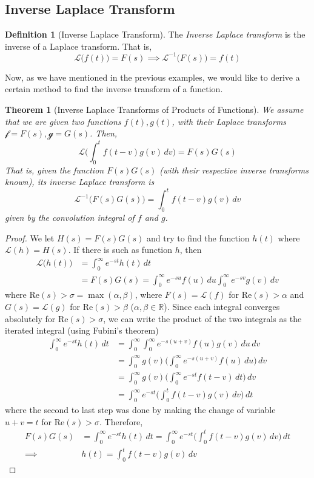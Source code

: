 \documentclass{article}
\newtheorem{theorem}{Theorem}[section]
\theoremstyle{remark}
\theoremstyle{definition}
\newtheorem{definition}{Definition}[section]
\begin{document}
\subsection{Inverse Laplace Transform}

\begin{definition}[Inverse Laplace Transform]
The \textit{Inverse Laplace transform} is the inverse of a Laplace transform. That is, 
\[\mathcal{L}\big( f(t)\big) = F(s) \implies  \mathcal{L}^{-1} \big(F(s)\big) = f(t)\]
\end{definition}

Now, as we have mentioned in the previous examples, we would like to derive a certain method to find the inverse transform of a function. 

\begin{theorem}[Inverse Laplace Transforms of Products of Functions]
We assume that we are given two functions $f(t), g(t)$, with their Laplace transforms $\mathcal{f} = F(s), \mathcal{g} = G(s)$. Then, 
\[\mathcal{L}\bigg(\int_0^t f(t-v) g(v)\,dv \bigg) = F(s)G(s)\]
That is, given the function $F(s) G(s)$ (with their respective inverse transforms known), its inverse Laplace transform is
\[\mathcal{L}^{-1} \big( F(s) G(s)\big) = \int_0^t f(t-v) g(v)\,dv\]
given by the convolution integral of $f$ and $g$. 
\end{theorem}
\begin{proof}
We let $H(s) = F(s) G(s)$ and try to find the function $h(t)$ where $\mathcal{L}(h) = H(s)$. If there is such as function $h$, then 
\begin{align*}
    \mathcal{L}\big(h(t)\big) & = \int_0^\infty e^{-st} h(t)\,dt \\
    & = F(s) G(s) = \int_0^\infty e^{-su} f(u) \,du \int_0^\infty e^{-sv} g(v)\,dv
\end{align*}
where Re$(s)>\sigma = \max{(\alpha, \beta)}$, where $F(s) = \mathcal{L}(f)$ for Re$(s)>\alpha$ and $G(s) = \mathcal{L}(g)$ for Re$(s)>\beta$ ($\alpha, \beta \in \mathbb{R}$). Since each integral converges absolutely for Re$(s) > \sigma$, we can write the product of the two integrals as the iterated integral (using Fubini's theorem) 
\begin{align*}
    \int_0^\infty e^{-st} h(t) \,dt & = \int_0^\infty \int_0^\infty e^{-s(u+v)} f(u) g(v)\,du \,dv \\
    & = \int_0^\infty g(v) \bigg(\int_0^\infty e^{-s(u+v)} f(u)\,du\bigg)\,dv \\
    & = \int_0^\infty g(v) \bigg( \int_0^\infty e^{-st} f(t-v) \,dt \bigg)\,dv \\
    & = \int_0^\infty e^{-st} \bigg( \int_0^t f(t-v) g(v)\,dv \bigg) \,dt
\end{align*}
where the second to last step was done by making the change of variable $u+v = t$ for Re$(s) > \sigma$. Therefore, 
\begin{align*}
    F(s) G(s) & = \int_0^\infty e^{-st} h(t) \,dt = \int_0^\infty e^{-st} \bigg( \int_0^t f(t-v) g(v)\,dv \bigg) \,dt \\
    \implies & h(t) = \int_0^t f(t-v) g(v)\,dv
\end{align*}
\end{proof}
\end{document}
